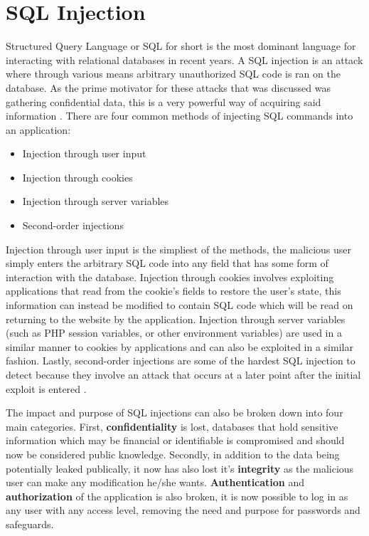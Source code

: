 \section{SQL Injection}\label{sec:sqliExplanation}
Structured Query Language or SQL for short is the most dominant language for interacting with relational databases in recent years.  A SQL injection is an attack where through various means arbitrary unauthorized SQL code is ran on the database.  As the prime motivator for these attacks that was discussed was gathering confidential data, this is a very powerful way of acquiring said information \cite{aSurveyOnWeb}.  There are four common methods of injecting SQL commands into an application:

\begin{itemize}
	\item Injection through user input
	\item Injection through cookies
	\item Injection through server variables
	\item Second-order injections
\end{itemize}

Injection through user input is the simpliest of the methods, the malicious user simply enters the arbitrary SQL code into any field that has some form of interaction with the database.  Injection through cookies involves exploiting applications that read from the cookie's fields to restore the user's state, this information can instead be modified to contain SQL code which will be read on returning to the website by the application.  Injection through server variables (such as PHP session variables, or other environment variables) are used in a similar manner to cookies by applications and can also be exploited in a similar fashion.  Lastly, second-order injections are some of the hardest SQL injection to detect because they involve an attack that occurs at a later point after the initial exploit is entered \cite{aClassificationOfSQL}.

The impact and purpose of SQL injections can also be broken down into four main categories.  First, \textbf{confidentiality} is lost, databases that hold sensitive information which may be financial or identifiable is compromised and should now be considered public knowledge.  Secondly, in addition to the data being potentially leaked publically, it now has also lost it's \textbf{integrity} as the malicious user can make any modification he/she wants.  \textbf{Authentication} and \textbf{authorization} of the application is also broken, it is now possible to log in as any user with any access level, removing the need and purpose for passwords and safeguards.

